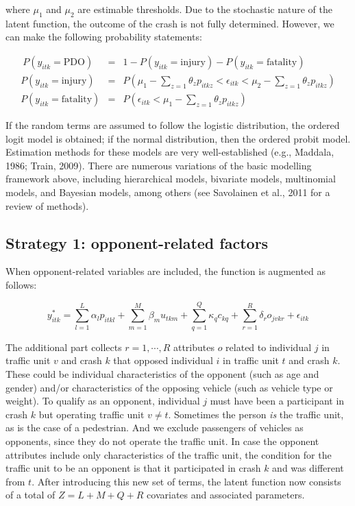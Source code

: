 \documentclass[]{elsarticle} %
\begin{document}
\noindent where \(\mu_1\) and \(\mu_2\) are estimable thresholds. Due to
the stochastic nature of the latent function, the outcome of the crash
is not fully determined. However, we can make the following probability
statements:

\begin{equation}
\label{eq:probability-ordered-outcomes}
\begin{array}{rcl}\
P(y_{itk} = \text{PDO}) &=& 1 - P(y_{itk} = \text{injury}) - P(y_{itk} = \text{fatality})\\ 
P(y_{itk} = \text{injury}) &=& P(\mu_1 - \sum_{z=1}\theta_zp_{itkz} < \epsilon_{itk} < \mu_2 - \sum_{z=1}\theta_zp_{itkz})\\
P(y_{itk} = \text{fatality}) &=& P(\epsilon_{itk} < \mu_1 - \sum_{z=1}\theta_zp_{itkz})
\end{array}
\end{equation}

If the random terms are assumed to follow the logistic distribution, the
ordered logit model is obtained; if the normal distribution, then the
ordered probit model. Estimation methods for these models are very
well-established (e.g., Maddala, 1986; Train, 2009). There are numerous
variations of the basic modelling framework above, including
hierarchical models, bivariate models, multinomial models, and Bayesian
models, among others (see Savolainen et al., 2011 for a review of
methods).

\hypertarget{strategy-1-opponent-related-factors}{%
\subsection{Strategy 1: opponent-related
factors}\label{strategy-1-opponent-related-factors}}

When opponent-related variables are included, the function is augmented
as follows:

\begin{equation}
\label{eq:latent-function-with-opponent-variables}
y_{itk}^*=\sum_{l=1}^L\alpha_lp_{itkl} + \sum_{m=1}^M\beta_mu_{tkm} + \sum_{q=1}^Q\kappa_qc_{kq} + \sum_{r=1}^R\delta_ro_{jvkr} + \epsilon_{itk}
\end{equation}

The additional part collects \(r=1,\cdots,R\) attributes \(o\) related
to individual \(j\) in traffic unit \(v\) and crash \(k\) that opposed
individual \(i\) in traffic unit \(t\) and crash \(k\). These could be
individual characteristics of the opponent (such as age and gender)
and/or characteristics of the opposing vehicle (such as vehicle type or
weight). To qualify as an opponent, individual \(j\) must have been a
participant in crash \(k\) but operating traffic unit \(v\ne t\).
Sometimes the person \emph{is} the traffic unit, as is the case of a
pedestrian. And we exclude passengers of vehicles as opponents, since
they do not operate the traffic unit. In case the opponent attributes
include only characteristics of the traffic unit, the condition for the
traffic unit to be an opponent is that it participated in crash \(k\)
and was different from \(t\). After introducing this new set of terms,
the latent function now consists of a total of \(Z=L+M+Q+R\) covariates
and associated parameters.
\end{document}
